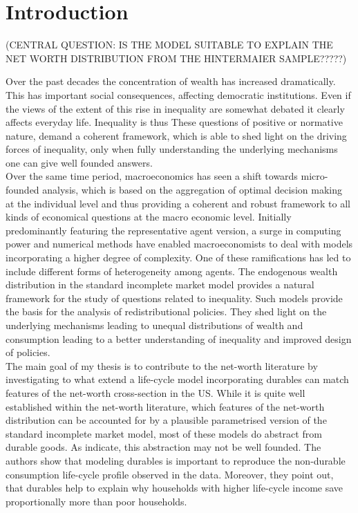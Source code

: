 \documentclass[12pt,a4paper,leqno]{article}
\theoremstyle{definition}
\begin{document}
\listoffigures

 \newpage



\setcounter{page}{1}        %


\section{Introduction}
\label{Introduction}


(CENTRAL QUESTION: IS THE MODEL SUITABLE TO EXPLAIN THE NET WORTH DISTRIBUTION FROM THE HINTERMAIER SAMPLE?????) 

Over the past decades the concentration of wealth has increased dramatically. This has important social consequences, affecting democratic institutions. Even if the views of the extent of this rise in inequality are somewhat debated it clearly affects everyday life. Inequality is thus 
These questions of positive or normative nature, demand a coherent framework, which is able to shed light on the driving forces of inequality, only when fully understanding the underlying mechanisms one can give well founded answers.\\ 
Over the same time period, macroeconomics has seen a shift towards micro-founded analysis, which is based on the aggregation of optimal decision making at the individual level and thus providing a coherent and robust framework to all kinds of economical questions at the macro economic level. Initially predominantly featuring the representative agent version, a surge in computing power and numerical methods have enabled macroeconomists to deal with models incorporating a higher degree of complexity. One of these ramifications has led to include different forms of heterogeneity among agents. The endogenous wealth distribution in the standard incomplete market model provides a natural framework for the study of questions related to inequality. Such models provide the basis for the analysis of redistributional policies. They shed light on the underlying mechanisms leading to unequal distributions of wealth and consumption leading to a better understanding of inequality and improved design of policies. \\

The main goal of my thesis is to contribute to the net-worth literature by investigating to what extend a life-cycle model incorporating durables can match features of the net-worth cross-section in the US. While it is quite well established within the net-worth literature, which features of the net-worth distribution can be accounted for by a plausible parametrised version of the standard incomplete market model, most of these models do abstract from durable goods. As \cite{FV&K2011}  indicate, this abstraction may not be well founded. The authors show that modeling durables is important to reproduce the non-durable consumption life-cycle profile observed in the data. Moreover, they point out, that durables help to explain why households with higher life-cycle income save proportionally more than poor households.\\
\end{document}
